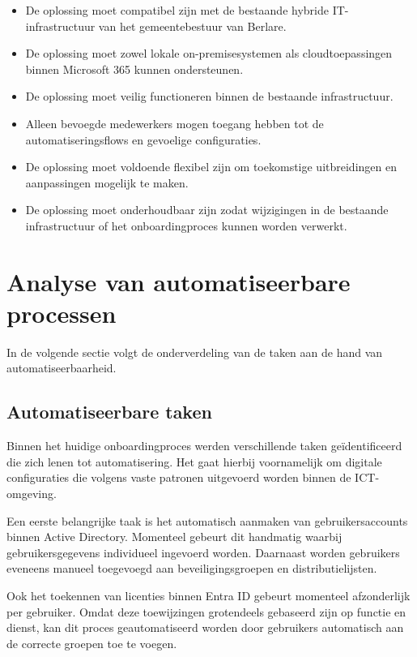 \begin{itemize}
    \item De oplossing moet compatibel zijn met de bestaande hybride IT-infrastructuur van het gemeentebestuur van Berlare.
    \item De oplossing moet zowel lokale on-premisesystemen als cloudtoepassingen binnen Microsoft 365 kunnen ondersteunen.
    \item De oplossing moet veilig functioneren binnen de bestaande infrastructuur.
    \item Alleen bevoegde medewerkers mogen toegang hebben tot de automatiseringsflows en gevoelige configuraties.
    \item De oplossing moet voldoende flexibel zijn om toekomstige uitbreidingen en aanpassingen mogelijk te maken.
    \item De oplossing moet onderhoudbaar zijn zodat wijzigingen in de bestaande infrastructuur of het onboardingproces kunnen worden verwerkt.
\end{itemize}

\section{Analyse van automatiseerbare processen}

In de volgende sectie volgt de onderverdeling van de taken aan de hand van automatiseerbaarheid.

\subsection{Automatiseerbare taken}

Binnen het huidige onboardingproces werden verschillende taken geïdentificeerd die zich lenen tot automatisering. Het gaat hierbij voornamelijk om digitale configuraties die volgens vaste patronen uitgevoerd worden binnen de ICT-omgeving.

Een eerste belangrijke taak is het automatisch aanmaken van gebruikersaccounts binnen Active Directory. Momenteel gebeurt dit handmatig waarbij gebruikersgegevens individueel ingevoerd worden. Daarnaast worden gebruikers eveneens manueel toegevoegd aan beveiligingsgroepen en distributielijsten.

Ook het toekennen van licenties binnen Entra ID gebeurt momenteel afzonderlijk per gebruiker. Omdat deze toewijzingen grotendeels gebaseerd zijn op functie en dienst, kan dit proces geautomatiseerd worden door gebruikers automatisch aan de correcte groepen toe te voegen.

